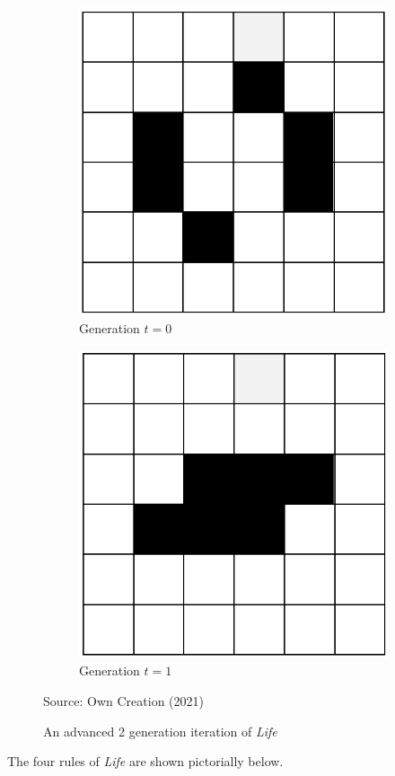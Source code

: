 \begin{figure}[H]
\centering
\begin{subfigure}{.5\textwidth}
  \centering
  \includegraphics[width=.4\linewidth]{Figures/Chapter2/toad1.png}
  \caption{Generation $t = 0$}
\end{subfigure}%
\begin{subfigure}{.5\textwidth}
  \centering
  \includegraphics[width=.4\linewidth]{Figures/Chapter2/toad2.png}
  \caption{Generation $t = 1$}
\end{subfigure}
\caption{An advanced 2 generation iteration of \textsl{Life}}
\begin{center}
Source: Own Creation (2021)
\end{center}
\end{figure}
The four rules of \textit{Life} are shown pictorially below.
